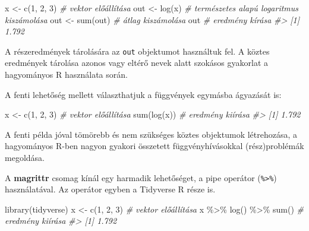 \documentclass[
]{book}
\newenvironment{Shaded}{\begin{snugshade}}{\end{snugshade}}
\newcommand{\CommentTok}[1]{\textcolor[rgb]{0.56,0.35,0.01}{\textit{#1}}}
\newcommand{\DecValTok}[1]{\textcolor[rgb]{0.00,0.00,0.81}{#1}}
\newcommand{\FunctionTok}[1]{\textcolor[rgb]{0.00,0.00,0.00}{#1}}
\newcommand{\NormalTok}[1]{#1}
\newcommand{\OtherTok}[1]{\textcolor[rgb]{0.56,0.35,0.01}{#1}}
\newcommand{\SpecialCharTok}[1]{\textcolor[rgb]{0.00,0.00,0.00}{#1}}
\begin{document}
\begin{Shaded}
\begin{Highlighting}[]
\NormalTok{x }\OtherTok{\textless{}{-}} \FunctionTok{c}\NormalTok{(}\DecValTok{1}\NormalTok{, }\DecValTok{2}\NormalTok{, }\DecValTok{3}\NormalTok{)       }\CommentTok{\# vektor előállítása}
\NormalTok{out }\OtherTok{\textless{}{-}} \FunctionTok{log}\NormalTok{(x)         }\CommentTok{\# természetes alapú logaritmus kiszámolása  }
\NormalTok{out }\OtherTok{\textless{}{-}} \FunctionTok{sum}\NormalTok{(out)       }\CommentTok{\# átlag kiszámolása}
\NormalTok{out                   }\CommentTok{\# eredmény kírása}
\CommentTok{\#\textgreater{} [1] 1.792}
\end{Highlighting}
\end{Shaded}

A részeredmények tárolására az \texttt{out} objektumot használtuk fel. A köztes eredmények tárolása azonos vagy eltérő nevek alatt szokásos gyakorlat a hagyományos R használata során.

A fenti lehetőség mellett választhatjuk a függvények egymásba ágyazását is:

\begin{Shaded}
\begin{Highlighting}[]
\NormalTok{x   }\OtherTok{\textless{}{-}} \FunctionTok{c}\NormalTok{(}\DecValTok{1}\NormalTok{, }\DecValTok{2}\NormalTok{, }\DecValTok{3}\NormalTok{)     }\CommentTok{\# vektor előállítása}
\FunctionTok{sum}\NormalTok{(}\FunctionTok{log}\NormalTok{(x))           }\CommentTok{\# eredmény kiírása}
\CommentTok{\#\textgreater{} [1] 1.792}
\end{Highlighting}
\end{Shaded}

A fenti példa jóval tömörebb és nem szükséges köztes objektumok létrehozása, a hagyományos R-ben nagyon gyakori összetett függvényhívásokkal (rész)problémák megoldása.

A \textbf{magrittr} csomag kínál egy harmadik lehetőséget, a pipe operátor (\texttt{\%\textgreater{}\%}) használatával. Az operátor egyben a Tidyverse R része is.

\begin{Shaded}
\begin{Highlighting}[]
\FunctionTok{library}\NormalTok{(tidyverse)}
\NormalTok{x   }\OtherTok{\textless{}{-}} \FunctionTok{c}\NormalTok{(}\DecValTok{1}\NormalTok{, }\DecValTok{2}\NormalTok{, }\DecValTok{3}\NormalTok{)     }\CommentTok{\# vektor előállítása}
\NormalTok{x }\SpecialCharTok{\%\textgreater{}\%} \FunctionTok{log}\NormalTok{() }\SpecialCharTok{\%\textgreater{}\%} \FunctionTok{sum}\NormalTok{() }\CommentTok{\# eredmény kiírása}
\CommentTok{\#\textgreater{} [1] 1.792}
\end{Highlighting}
\end{Shaded}
\end{document}
